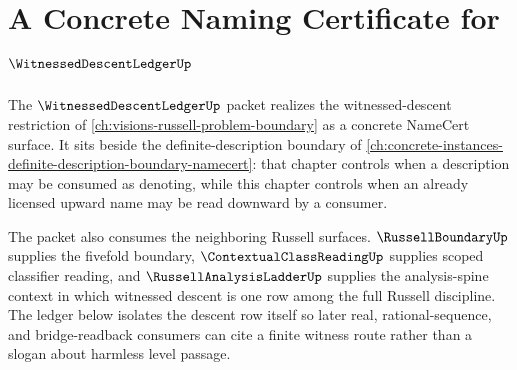 \chapter{A Concrete Naming Certificate for $\WitnessedDescentLedgerUp$}
\label{ch:concrete-instances-witnessed-descent-ledger-namecert}



The $\WitnessedDescentLedgerUp$ packet realizes the witnessed-descent restriction of \autoref{ch:visions-russell-problem-boundary} as a concrete NameCert surface. It sits beside the definite-description boundary of \autoref{ch:concrete-instances-definite-description-boundary-namecert}: that chapter controls when a description may be consumed as denoting, while this chapter controls when an already licensed upward name may be read downward by a consumer.

The packet also consumes the neighboring Russell surfaces. $\RussellBoundaryUp$ supplies the fivefold boundary, $\ContextualClassReadingUp$ supplies scoped classifier reading, and $\RussellAnalysisLadderUp$ supplies the analysis-spine context in which witnessed descent is one row among the full Russell discipline. The ledger below isolates the descent row itself so later real, rational-sequence, and bridge-readback consumers can cite a finite witness route rather than a slogan about harmless level passage.

